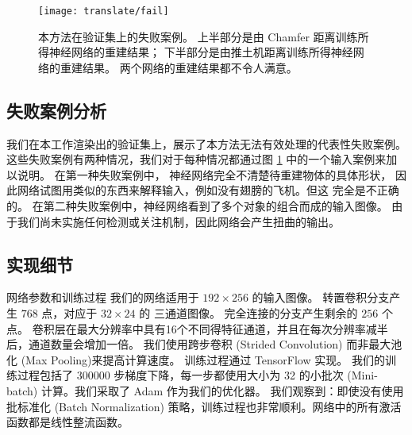 \begin{figure}[h]
	\centering
	\texttt{[image: translate/fail]}
	\caption[]{本方法在验证集上的失败案例。
		上半部分是由 Chamfer 距离训练所得神经网络的重建结果；
		下半部分是由推土机距离训练所得神经网络的重建结果。
		两个网络的重建结果都不令人满意。
	}
	\label{fig:translate:fail}
\end{figure}

\subsection{失败案例分析}
我们在本工作渲染出的验证集上，展示了本方法无法有效处理的代表性失败案例。
这些失败案例有两种情况，我们对于每种情况都通过图 \ref{fig:translate:fail} 中的一个输入案例来加以说明。
在第一种失败案例中，%
神经网络完全不清楚待重建物体的具体形状，
因此网络试图用类似的东西来解释输入，例如没有翅膀的飞机。但这%
完全是不正确的。%
在第二种失败案例中，神经网络看到了多个对象的组合而成的输入图像。 由于我们尚未实施任何检测或关注机制，因此网络会产生扭曲的输出。



\subsection{实现细节 \label{section:translate:psg_detail}}


{\heiti 网络参数和训练过程}
我们的网络适用于 $192 \times 256$ 的输入图像。
转置卷积分支产生 $768$ 点，对应于 $32 \times 24$ 的 三通道图像。 完全连接的分支产生剩余的 $256$ 个点。
卷积层在最大分辨率中具有16个不同得特征通道，并且在每次分辨率减半后，通道数量会增加一倍。
我们使用跨步卷积 (Strided Convolution) 而非最大池化 (Max Pooling)来提高计算速度。 训练过程通过 TensorFlow 实现。
我们的训练过程包括了 300000 步梯度下降，每一步都使用大小为 32 的小批次 (Mini-batch) 计算。我们采取了 Adam 作为我们的优化器。
我们观察到：即使没有使用批标准化 (Batch Normalization) 策略，训练过程也非常顺利。网络中的所有激活函数都是线性整流函数。

